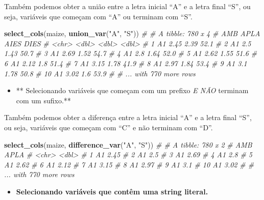 \documentclass[
]{book}
\newenvironment{Shaded}{\begin{snugshade}}{\end{snugshade}}
\newcommand{\CommentTok}[1]{\textcolor[rgb]{0.56,0.35,0.01}{\textit{#1}}}
\newcommand{\KeywordTok}[1]{\textcolor[rgb]{0.13,0.29,0.53}{\textbf{#1}}}
\newcommand{\NormalTok}[1]{#1}
\newcommand{\StringTok}[1]{\textcolor[rgb]{0.31,0.60,0.02}{#1}}
\providecommand{\tightlist}{%
  \setlength{\itemsep}{0pt}\setlength{\parskip}{0pt}}
\begin{document}
Também podemos obter a união entre a letra inicial ``A'' e a letra final ``S'', ou seja, variáveis que começam com ``A'' ou terminam com ``S''.

\begin{Shaded}
\begin{Highlighting}[]
\KeywordTok{select_cols}\NormalTok{(maize, }\KeywordTok{union_var}\NormalTok{(}\StringTok{"A"}\NormalTok{, }\StringTok{"S"}\NormalTok{))}
\CommentTok{# # A tibble: 780 x 4}
\CommentTok{#    AMB    APLA  AIES  DIES}
\CommentTok{#    <chr> <dbl> <dbl> <dbl>}
\CommentTok{#  1 A1     2.45  2.39  52.1}
\CommentTok{#  2 A1     2.5   1.43  50.7}
\CommentTok{#  3 A1     2.69  1.52  54.7}
\CommentTok{#  4 A1     2.8   1.64  52.0}
\CommentTok{#  5 A1     2.62  1.55  51.6}
\CommentTok{#  6 A1     2.12  1.8   51.4}
\CommentTok{#  7 A1     3.15  1.78  41.9}
\CommentTok{#  8 A1     2.97  1.84  53.4}
\CommentTok{#  9 A1     3.1   1.78  50.8}
\CommentTok{# 10 A1     3.02  1.6   53.9}
\CommentTok{# # ... with 770 more rows}
\end{Highlighting}
\end{Shaded}

\begin{itemize}
\tightlist
\item
  ** Selecionando variáveis que começam com um prefixo \emph{E NÃO} terminam com um sufixo.**
\end{itemize}

Também podemos obter a diferença entre a letra inicial ``A'' e a letra final ``S'', ou seja, variáveis que começam com ``C'' e não terminam com ``D''.

\begin{Shaded}
\begin{Highlighting}[]
\KeywordTok{select_cols}\NormalTok{(maize, }\KeywordTok{difference_var}\NormalTok{(}\StringTok{"A"}\NormalTok{, }\StringTok{"S"}\NormalTok{))}
\CommentTok{# # A tibble: 780 x 2}
\CommentTok{#    AMB    APLA}
\CommentTok{#    <chr> <dbl>}
\CommentTok{#  1 A1     2.45}
\CommentTok{#  2 A1     2.5 }
\CommentTok{#  3 A1     2.69}
\CommentTok{#  4 A1     2.8 }
\CommentTok{#  5 A1     2.62}
\CommentTok{#  6 A1     2.12}
\CommentTok{#  7 A1     3.15}
\CommentTok{#  8 A1     2.97}
\CommentTok{#  9 A1     3.1 }
\CommentTok{# 10 A1     3.02}
\CommentTok{# # ... with 770 more rows}
\end{Highlighting}
\end{Shaded}

\begin{itemize}
\tightlist
\item
  \textbf{Selecionando variáveis que contêm uma string literal.}
\end{itemize}
\end{document}
